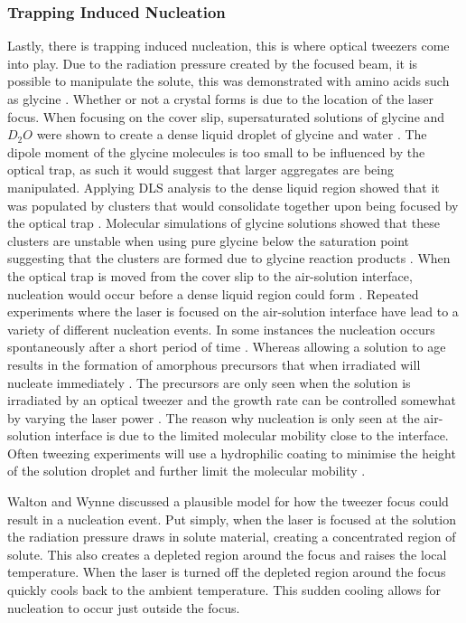 \subsubsection{Trapping Induced Nucleation}
Lastly, there is trapping induced nucleation, this is where optical tweezers 
come into play. Due to the radiation pressure created by the focused beam,
it is possible to manipulate the solute, this was demonstrated with amino
acids such as glycine \cite{Tsuboi2009}. Whether or not a crystal forms is 
due to the location of the laser focus. When focusing on the cover slip, supersaturated solutions of glycine and $D_2O$ were shown to create a dense liquid droplet of glycine and water \cite{Yuyama2010, Yuyama2012}. The dipole moment of the glycine molecules is too small to be influenced by the optical trap, as such it would suggest that larger aggregates are being manipulated. Applying DLS analysis to the dense liquid region showed that it was populated by clusters that would consolidate together upon being focused by the 
optical trap \cite{Gowayed2021}. Molecular simulations of glycine solutions showed that these clusters are unstable when using pure glycine below the saturation point suggesting that the clusters are formed due to glycine reaction products \cite{Sweatman2022}. When the optical trap is moved from the cover slip to the air-solution interface, nucleation would occur before a dense liquid region could form \cite{Yuyama2010}.
Repeated experiments where the laser is focused on the air-solution interface have lead to a variety of different nucleation events. In some instances the nucleation occurs spontaneously after a short period of time \cite{Yuyama2010}. Whereas allowing a solution to age results in the formation of amorphous precursors that when irradiated will nucleate immediately \cite{Liao2022}. The precursors are only seen when the solution is irradiated by an optical tweezer and the growth rate can be controlled somewhat by varying the laser power \cite{Liao2022}. The reason why nucleation is only seen at the air-solution interface is due to the limited molecular mobility close to the interface. Often tweezing experiments will use a hydrophilic 
coating to minimise the height of the solution droplet and further limit
the molecular mobility \cite{Yuyama2012, Gowayed2021}.

Walton and Wynne discussed a plausible model for how the tweezer focus
could result in a nucleation event. Put simply, when the laser is focused
at the solution the radiation pressure draws in solute material, creating 
a concentrated region of solute. This also creates a depleted region 
around the focus and raises the local temperature. When the laser is 
turned off the depleted region around the focus quickly cools back to the 
ambient temperature. This sudden cooling allows for nucleation to occur
just outside the focus.  

